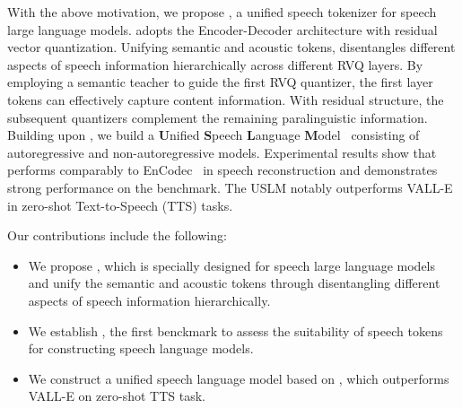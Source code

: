 With the above motivation, we propose \method, a unified speech tokenizer for speech large language models. \method adopts the Encoder-Decoder architecture with residual vector quantization.
Unifying semantic and acoustic tokens, \method disentangles different aspects of
speech information hierarchically across different RVQ layers.
By employing a semantic teacher to guide the first RVQ quantizer, the first layer tokens can effectively capture content information. With residual structure, the subsequent quantizers complement the remaining paralinguistic information. 
Building upon \method, we build a \textbf{U}nified \textbf{S}peech \textbf{L}anguage \textbf{M}odel~ consisting
of autoregressive and non-autoregressive models. Experimental results show that \method performs comparably to EnCodec~\citep{défossez2022high} in speech reconstruction and  demonstrates strong performance on the \bench benchmark. The USLM notably outperforms VALL-E~\citep{wang2023neural} in zero-shot Text-to-Speech (TTS) tasks. 



Our contributions include the following:
 \begin{itemize}[itemsep=1pt, leftmargin=10pt, parsep=0pt, topsep=1pt]
    \item 
    We propose \method, which is specially designed for speech large language models and unify the semantic and acoustic tokens through disentangling different aspects of speech information hierarchically.




    \item 
    We establish \bench, the first benckmark to assess the suitability of speech tokens for constructing speech language models.

    
    \item 
    We construct a unified speech language model based on \method, which outperforms VALL-E on zero-shot TTS task.


    
    
\end{itemize}
